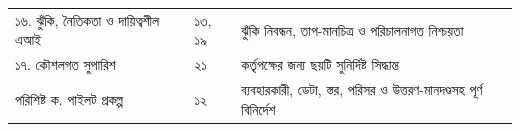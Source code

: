 \documentclass[border=10pt]{standalone}
\begin{document}
\begin{minipage}{17cm}
\begin{tabularx}{\linewidth}{@{}>{\hsize=0.892\hsize\raggedright\arraybackslash}X>{\hsize=0.649\hsize\raggedright\arraybackslash}X>{\hsize=1.459\hsize\raggedright\arraybackslash}X@{}}
১৬. ঝুঁকি, নৈতিকতা ও দায়িত্বশীল এআই & ১৩, ১৯ & ঝুঁকি নিবন্ধন, তাপ-মানচিত্র ও পরিচালনাগত নিশ্চয়তা \\
১৭. কৌশলগত সুপারিশ & ২১ & কর্তৃপক্ষের জন্য ছয়টি সুনির্দিষ্ট সিদ্ধান্ত \\
পরিশিষ্ট ক. পাইলট প্রকল্প & ১২ & ব্যবহারকারী, ডেটা, স্তর, পরিসর ও উত্তরণ-মানদণ্ডসহ পূর্ণ বিনির্দেশ \\
\bottomrule
\end{tabularx}
\par{}
\end{minipage}
\end{document}
